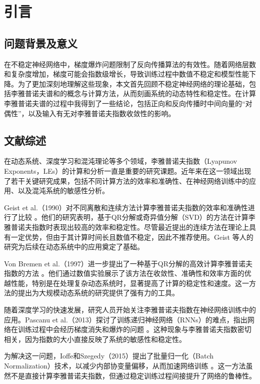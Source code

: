 
\chapter{引言}

\section{问题背景及意义}

在不稳定神经网络中，梯度爆炸问题限制了反向传播算法的有效性。随着网络层数和复杂度增加，梯度可能会指数级增长，导致训练过程中数值不稳定和模型性能下降。为了更加深刻地理解这些现象，本文首先回顾不稳定神经网络的理论基础，包括李雅普诺夫谱和的概念与计算方法，从而刻画系统的动态特性和稳定性。在计算李雅普诺夫谱的过程中我得到了一些结论，包括正向和反向传播时中间向量的“对偶性”，以及输入有无对李雅普诺夫指数收敛性的影响。

\section{文献综述}

在动态系统、深度学习和混沌理论等多个领域，李雅普诺夫指数（Lyapunov Exponents，LEs）的计算和分析一直是重要的研究课题。近年来在这一领域出现了若干关键研究成果，包括不同计算方法的效率和准确性、在神经网络训练中的应用、以及混沌系统的敏感性分析。

Geist et al.（1990）对不同离散和连续方法计算李雅普诺夫指数的效率和准确性进行了比较 \cite{Geist1990}。他们的研究表明，基于QR分解或奇异值分解（SVD）的方法在计算李雅普诺夫指数时表现出较高的效率和稳定性。尽管最近提出的连续方法在理论上具有一定优势，但由于其计算时间长且数值不稳定，因此不推荐使用。Geist 等人的研究为后续在动态系统中的应用奠定了基础。

Von Bremen et al.（1997）进一步提出了一种基于QR分解的高效计算李雅普诺夫指数的方法 \cite{VONBREMEN19971}。他们通过数值实验展示了该方法在收敛性、准确性和效率方面的优越性能，特别是在处理复杂动态系统时，显著提高了计算的稳定性和速度。这一方法的提出为大规模动态系统的研究提供了强有力的工具。

随着深度学习的快速发展，研究人员开始关注李雅普诺夫指数在神经网络训练中的应用。Pascanu et al.（2013）探讨了训练递归神经网络（RNNs）的难点，指出网络在训练过程中会经历梯度消失和爆炸的问题 \cite{pascanu2013difficulty}。这种现象与李雅普诺夫指数密切相关，因为指数的大小直接反映了系统的敏感性和稳定性。

为解决这一问题，Ioffe和Szegedy（2015）提出了批量归一化（Batch Normalization）技术，以减少内部协变量偏移，从而加速网络训练 \cite{ioffe2015batch}。这一方法虽然不是直接计算李雅普诺夫指数，但通过稳定训练过程间接提升了网络的鲁棒性。

